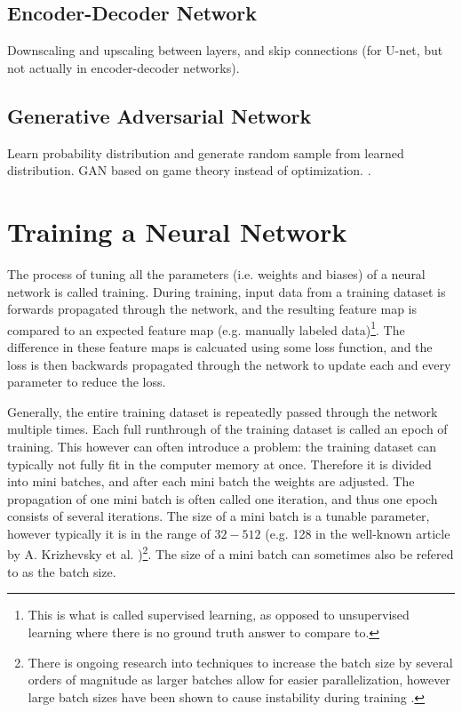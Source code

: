 
\subsection{Encoder-Decoder Network}
Downscaling and upscaling between layers, and skip connections (for U-net, but not actually in encoder-decoder networks). %

\subsection{Generative Adversarial Network}
Learn probability distribution and generate random sample from learned distribution. 
GAN based on game theory instead of optimization. \cite{goodfellow2014gan,goodfellow2020gan}. 

\section{Training a Neural Network}
The process of tuning all the parameters (i.e. weights and biases) of a neural network is called training. During training, input data from a training dataset is forwards propagated through the network, and the resulting feature map is compared to an expected feature map (e.g. manually labeled data)\footnote{This is what is called supervised learning, as opposed to unsupervised learning where there is no ground truth answer to compare to. }. The difference in these feature maps is calcuated using some loss function, and the loss is then backwards propagated through the network to update each and every parameter to reduce the loss. 

Generally, the entire training dataset is repeatedly passed through the network multiple times. Each full runthrough of the training dataset is called an epoch of training. This however can often introduce a problem: the training dataset can typically not fully fit in the computer memory at once. Therefore it is divided into mini batches, and after each mini batch the weights are adjusted. The propagation of one mini batch is often called one iteration, and thus one epoch consists of several iterations. The size of a mini batch is a tunable parameter, however typically it is in the range of $32-512$ (e.g. 128 in the well-known article by A. Krizhevsky et al. \cite{alexnet})\footnote{There is ongoing research into techniques to increase the batch size by several orders of magnitude as larger batches allow for easier parallelization, however large batch sizes have been shown to cause instability during training \cite{you2017large}. }. The size of a mini batch can sometimes also be refered to as the batch size. 

